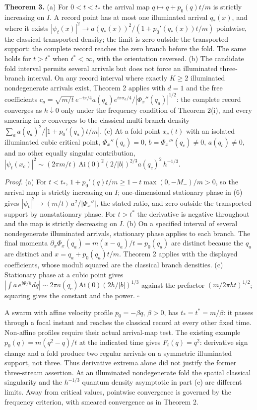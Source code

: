 \documentclass[11pt,a4paper]{article}
\begin{document}
\textbf{Theorem 3.} (a) For \(0<t<t_*\) the arrival map
\(q\mapsto q+p_0(q)t/m\) is strictly increasing on \(I\). A record point
has at most one illuminated arrival \(q_*(x)\), and where it exists
\(|\psi_t(x)|^2\to a(q_*(x))^2/(1+p_0'(q_*(x))t/m)\) pointwise, the
classical transported density; the limit is zero outside the transported
support: the complete record reaches the zero branch before the fold.
The same holds for \(t>t^*\) when \(t^*<\infty\), with the orientation
reversed. (b) The candidate fold interval permits several arrivals but
does not force an illuminated three-branch interval. On any record
interval where exactly \(K\ge2\) illuminated nondegenerate arrivals
exist, Theorem 2 applies with \(d=1\) and the free coefficients
\(c_a=\sqrt{m/t}\,e^{-i\pi/4}a(q_a)e^{i\pi\sigma_a/4}/|\Phi_x''(q_a)|^{1/2}\):
the complete record converges as \(h\downarrow0\) only under the
frequency condition of Theorem 2(i), and every smearing in \(x\)
converges to the classical multi-branch density
\(\sum_a a(q_a)^2/|1+p_0'(q_a)t/m|\). (c) At a fold point \(x_c(t)\)
with an isolated illuminated cubic critical point, \(\Phi_x''(q_c)=0\),
\(b=\Phi_x'''(q_c)\neq0\), \(a(q_c)\neq0\), and no other equally
singular contribution,
\(|\psi_t(x_c)|^2\sim(2\pi m/t)\,\mathrm{Ai}(0)^2(2/|b|)^{2/3}a(q_c)^2\,h^{-1/3}\).

\emph{Proof.} (a) For \(t<t_*\), \(1+p_0'(q)t/m\ge1-t\max(0,-M_-)/m>0\),
so the arrival map is strictly increasing on \(I\); one-dimensional
stationary phase in (6) gives \(|\psi_t|^2\to(m/t)\,a^2/|\Phi_x''|\),
the stated ratio, and zero outside the transported support by
nonstationary phase. For \(t>t^*\) the derivative is negative throughout
and the map is strictly decreasing on \(I\). (b) On a specified interval
of several nondegenerate illuminated arrivals, stationary phase applies
to each branch. The final momenta
\(\partial_x\Phi_x(q_a)=m(x-q_a)/t=p_0(q_a)\) are distinct because the
\(q_a\) are distinct and \(x=q_a+p_0(q_a)t/m\). Theorem 2 applies with
the displayed coefficients, whose moduli squared are the classical
branch densities. (c) Stationary phase at a cubic point gives
\(|\int a\,e^{i\Phi/h}dq|\sim2\pi a(q_c)\mathrm{Ai}(0)(2h/|b|)^{1/3}\)
against the prefactor \((m/2\pi ht)^{1/2}\); squaring gives the constant
and the power. \(\square\)

A swarm with affine velocity profile \(p_0=-\beta q\), \(\beta>0\), has
\(t_*=t^*=m/\beta\): it passes through a focal instant and reaches the
classical record at every other fixed time. Non-affine profiles require
their actual arrival-map test. The existing example
\(p_0(q)=m(q^2-q)/t\) at the indicated time gives \(F_t(q)=q^2\):
derivative sign change and a fold produce two regular arrivals on a
symmetric illuminated support, not three. Thus derivative extrema alone
did not justify the former three-stream assertion. At an illuminated
nondegenerate fold the spatial classical singularity and the
\(h^{-1/3}\) quantum density asymptotic in part (c) are different
limits. Away from critical values, pointwise convergence is governed by
the frequency criterion, with smeared convergence as in Theorem 2.
\end{document}
